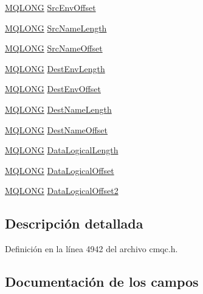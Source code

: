 \begin{DoxyCompactItemize}
\item 
\hyperlink{cmqc_8h_a1fb8d28cbda3fa8766a9821230cdb6d5}{M\+Q\+L\+O\+N\+G} \hyperlink{structtag_m_q_r_m_h_afd4fa1c8f37160669a03b8f52d2269a9}{Src\+Env\+Offset}
\item 
\hyperlink{cmqc_8h_a1fb8d28cbda3fa8766a9821230cdb6d5}{M\+Q\+L\+O\+N\+G} \hyperlink{structtag_m_q_r_m_h_abb6541ecffc934fffb2a1f23ac0fed0a}{Src\+Name\+Length}
\item 
\hyperlink{cmqc_8h_a1fb8d28cbda3fa8766a9821230cdb6d5}{M\+Q\+L\+O\+N\+G} \hyperlink{structtag_m_q_r_m_h_a253af24d5627cf285175bdaad83f1995}{Src\+Name\+Offset}
\item 
\hyperlink{cmqc_8h_a1fb8d28cbda3fa8766a9821230cdb6d5}{M\+Q\+L\+O\+N\+G} \hyperlink{structtag_m_q_r_m_h_ab43faacc2be6db1af47d25c6e0c365a7}{Dest\+Env\+Length}
\item 
\hyperlink{cmqc_8h_a1fb8d28cbda3fa8766a9821230cdb6d5}{M\+Q\+L\+O\+N\+G} \hyperlink{structtag_m_q_r_m_h_a6b713ca1696efb2b70717337d9bc1d7c}{Dest\+Env\+Offset}
\item 
\hyperlink{cmqc_8h_a1fb8d28cbda3fa8766a9821230cdb6d5}{M\+Q\+L\+O\+N\+G} \hyperlink{structtag_m_q_r_m_h_ab9282b708ae3f8c8d96f82b0c335f96e}{Dest\+Name\+Length}
\item 
\hyperlink{cmqc_8h_a1fb8d28cbda3fa8766a9821230cdb6d5}{M\+Q\+L\+O\+N\+G} \hyperlink{structtag_m_q_r_m_h_ac9da8d1599bd55a51b26688aaa866da7}{Dest\+Name\+Offset}
\item 
\hyperlink{cmqc_8h_a1fb8d28cbda3fa8766a9821230cdb6d5}{M\+Q\+L\+O\+N\+G} \hyperlink{structtag_m_q_r_m_h_ab41c53790818701e5dfd105ba91b581e}{Data\+Logical\+Length}
\item 
\hyperlink{cmqc_8h_a1fb8d28cbda3fa8766a9821230cdb6d5}{M\+Q\+L\+O\+N\+G} \hyperlink{structtag_m_q_r_m_h_af68e2a3064ab13d5cfbe861444bf9615}{Data\+Logical\+Offset}
\item 
\hyperlink{cmqc_8h_a1fb8d28cbda3fa8766a9821230cdb6d5}{M\+Q\+L\+O\+N\+G} \hyperlink{structtag_m_q_r_m_h_a99bf506b44a5386a018e2408a2a5f3f3}{Data\+Logical\+Offset2}
\end{DoxyCompactItemize}


\subsection{Descripción detallada}


Definición en la línea 4942 del archivo cmqc.\+h.



\subsection{Documentación de los campos}
\hypertarget{structtag_m_q_r_m_h_a4d8d1961a991850d1355cdf9b4680b8e}{}
